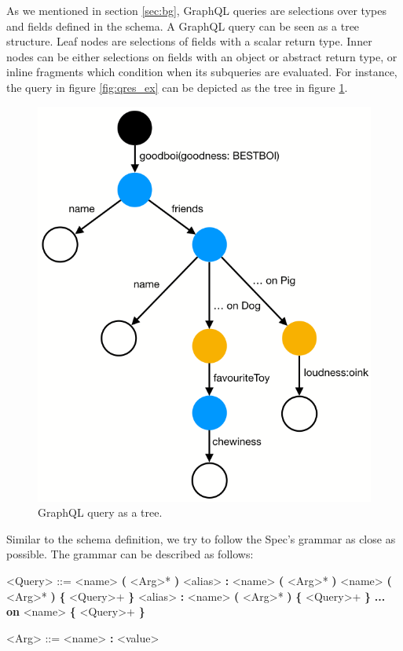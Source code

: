 As we mentioned in section \ref{sec:bg}, GraphQL queries are selections over types and fields defined in the schema. A GraphQL query can be seen as a tree structure. Leaf nodes are selections of fields with a scalar return type. Inner nodes can be either selections on fields with an object or abstract return type, or inline fragments which condition when its subqueries are evaluated. For instance, the query in figure \ref{fig:qres_ex} can be depicted as the tree in figure \ref{fig:query_tree}.

\begin{figure}
    \centering
    \includegraphics[scale=0.33]{imgs/query_tree.png}
    \caption{GraphQL query as a tree.}
    \label{fig:query_tree}
\end{figure}

Similar to the schema definition, we try to follow the Spec's grammar as close as possible. The grammar can be described as follows:
\begin{grammar}
    <Query> ::= <name> \textbf{(} <Arg>* \textbf{)}
    \alt <alias> \textbf{:} <name> \textbf{(} <Arg>* \textbf{)}
    \alt <name> \textbf{(} <Arg>* \textbf{)} \textbf{\{} <Query>+ \textbf{\}}
    \alt <alias> \textbf{:} <name> \textbf{(} <Arg>* \textbf{)} \textbf{\{} <Query>+ \textbf{\}}
    \alt \textbf{... on} <name> \textbf{\{} <Query>+ \textbf{\}}
    
    <Arg> ::= <name> \textbf{:} <value>
\end{grammar}
    
